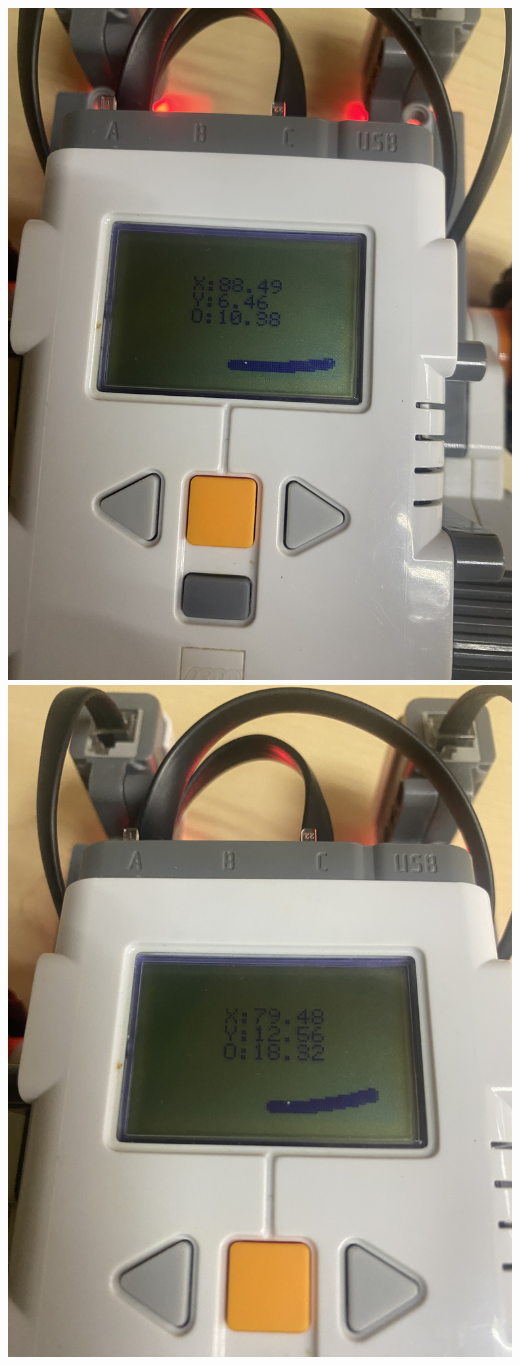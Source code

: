 \documentclass[oneside,twocolumn]{article}
\begin{document}
\includegraphics[scale=0.09]{graficos/error1.png}
\includegraphics[scale=0.09]{graficos/error2.png}
\end{document}
